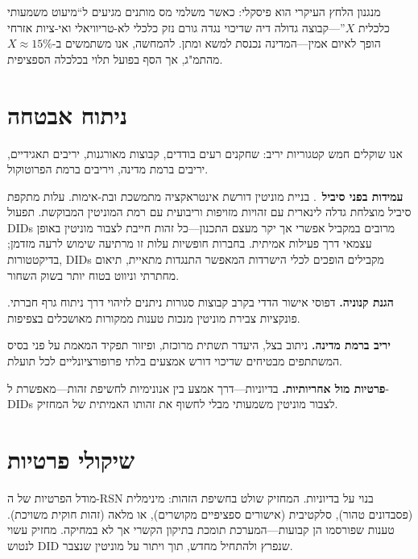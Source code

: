 \documentclass[11pt,a4paper,twocolumn]{article}
\begin{document}
מנגנון הלחץ העיקרי הוא פיסקלי: כאשר משלמי מס מותנים מגיעים ל``מיעוט משמעותי כלכלית $X$''---קבוצה גדולה דיה שדיכוי נגדה גורם נזק כלכלי לא-טריוויאלי ואי-ציות אזרחי הופך לאיום אמין---המדינה נכנסת למשא ומתן. להמחשה, אנו משתמשים ב-$X \approx 15\%$ מהתמ"ג, אך הסף בפועל תלוי בכלכלה הספציפית.

\section{ניתוח אבטחה}

אנו שוקלים חמש קטגוריות יריב: שחקנים רעים בודדים, קבוצות מאורגנות, יריבים תאגידיים, יריבים ברמת מדינה, ויריבים ברמת הפרוטוקול.

\textbf{עמידות בפני סיביל}~\cite{douceur2002}. בניית מוניטין דורשת אינטראקציה מתמשכת ובת-אימות. עלות מתקפת סיביל מוצלחת גדלה לינארית עם זהויות מזויפות וריבועית עם רמת המוניטין המבוקשת. תפעול DIDs מרובים במקביל אפשרי אך יקר מעצם התכנון---כל זהות חייבת לצבור מוניטין באופן עצמאי דרך פעילות אמיתית. בחברות חופשיות עלות זו מרתיעה שימוש לרעה מזדמן; בדיקטטורות, DIDs מקבילים הופכים לכלי הישרדות המאפשר התנגדות מתאיית, תיאום מחתרתי וניווט בטוח יותר בשוק השחור.

\textbf{הגנת קנוניה.} דפוסי אישור הדדי בקרב קבוצות סגורות ניתנים לזיהוי דרך ניתוח גרף חברתי. פונקציות צבירת מוניטין מנכות טענות ממקורות מאושכלים בצפיפות.

\textbf{יריב ברמת מדינה.} ניתוב בצל, היעדר תשתית מרוכזת, ופיזור תפקיד המאמת על פני בסיס המשתתפים מבטיחים שדיכוי דורש אמצעים בלתי פרופורציונליים לכל תועלת.

\textbf{פרטיות מול אחריותיות.} בדיוניות---דרך אמצע בין אנונימיות לחשיפת זהות---מאפשרת ל-DIDs לצבור מוניטין משמעותי מבלי לחשוף את זהותו האמיתית של המחזיק.

\section{שיקולי פרטיות}

מודל הפרטיות של ה-RSN בנוי על בדיוניות. המחזיק שולט בחשיפת הזהות: מינימלית (פסבדונים טהור), סלקטיבית (אישורים ספציפיים מקושרים), או מלאה (זהות חוקית משויכת). טענות שפורסמו הן קבועות---המערכת תומכת בתיקון הקשרי אך לא במחיקה. מחזיק עשוי לנטוש DID שנפרץ ולהתחיל מחדש, תוך ויתור על מוניטין שנצבר.
\end{document}
